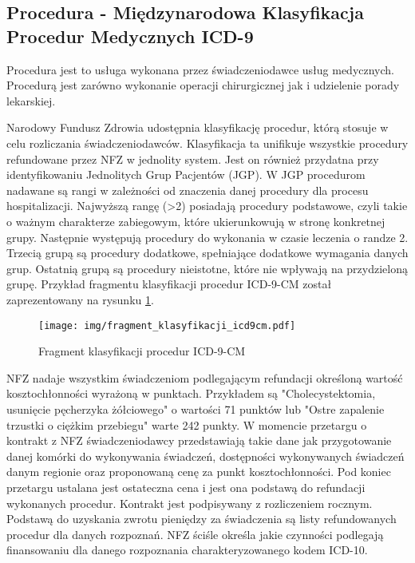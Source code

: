 \subsection{Procedura - Międzynarodowa Klasyfikacja Procedur Medycznych ICD-9}
\label{subsec:procedura}
Procedura jest to usługa wykonana przez świadczeniodawce usług medycznych. Procedurą jest zarówno wykonanie operacji chirurgicznej jak i udzielenie porady lekarskiej.

Narodowy Fundusz Zdrowia udostępnia klasyfikację procedur, którą stosuje w celu rozliczania świadczeniodawców. Klasyfikacja ta unifikuje wszystkie procedury refundowane przez NFZ w jednolity system. Jest on również przydatna przy identyfikowaniu Jednolitych Grup Pacjentów (JGP). W JGP procedurom nadawane są rangi w zależności od znaczenia danej procedury dla procesu hospitalizacji.  Najwyższą rangę (>2) posiadają procedury podstawowe, czyli takie o ważnym charakterze zabiegowym, które ukierunkowują w stronę konkretnej grupy. Następnie występują procedury do wykonania w czasie leczenia o randze 2. Trzecią grupą są procedury dodatkowe, spełniające dodatkowe wymagania danych grup. Ostatnią grupą są procedury nieistotne, które nie wpływają na przydzieloną grupę.
Przykład fragmentu klasyfikacji procedur ICD-9-CM został zaprezentowany na rysunku \ref{pkpidc9}.

\begin{figure}[htb]
    \begin{center}
	\texttt{[image: img/fragment\_klasyfikacji\_icd9cm.pdf]}
	\caption{Fragment klasyfikacji procedur ICD-9-CM}
	\label{pkpidc9}
    \end{center}
\end{figure}

NFZ nadaje wszystkim świadczeniom podlegającym refundacji określoną wartość kosztochłonności wyrażoną w punktach. Przykładem są "Cholecystektomia, usunięcie pęcherzyka żółciowego" o wartości 71 punktów lub "Ostre zapalenie trzustki o ciężkim przebiegu" warte 242 punkty. W momencie przetargu o kontrakt z NFZ świadczeniodawcy przedstawiają takie dane jak przygotowanie danej komórki do wykonywania świadczeń, dostępności wykonywanych świadczeń danym regionie oraz proponowaną cenę za punkt kosztochłonności. Pod koniec przetargu ustalana jest ostateczna cena i jest ona podstawą do refundacji wykonanych procedur. Kontrakt jest podpisywany z rozliczeniem rocznym. 
Podstawą do uzyskania zwrotu pieniędzy za świadczenia są listy refundowanych procedur dla danych rozpoznań. NFZ ściśle określa jakie czynności podlegają finansowaniu dla danego rozpoznania charakteryzowanego kodem ICD-10. 

